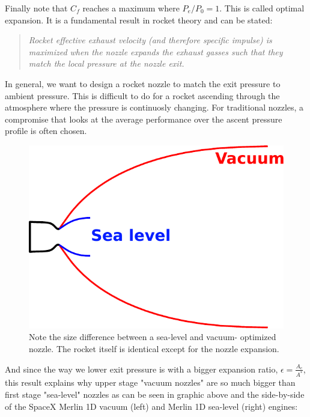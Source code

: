 \documentclass[twocolumn]{memoir} %
\begin{document}
Finally note that \(C_f\) reaches a maximum where \(P_e/P_0 = 1\). This
is called optimal expansion. It is a fundamental result in rocket theory
and can be stated:

\begin{quote}
    \emph{Rocket effective exhaust velocity (and therefore specific impulse) is
maximized when the nozzle expands the exhaust gasses such that they
    match the local pressure at the nozzle exit.}
\end{quote}

In general, we want to design a rocket nozzle to match
the exit pressure to ambient pressure. This is difficult to do for a
rocket ascending through the atmosphere where the pressure is
continuosly changing. For traditional nozzles, a compromise that looks
at the average performance over the ascent pressure profile is often
chosen.

\begin{figure}[H]
    \includegraphics[width=0.9\columnwidth]{nozzle_sl_vacuum.pdf}
    \caption{Note the size difference between a sea-level and vacuum- optimized 
    nozzle.  The rocket itself is identical except for the nozzle expansion.}
\end{figure}

And since the way we lower exit pressure is with a bigger expansion
ratio, \(\epsilon = \frac{A_e}{A^*}\), this result explains why upper
stage "vacuum nozzles" are so much bigger than first stage "sea-level"
nozzles as can be seen in graphic above and the side-by-side of the
SpaceX Merlin 1D vacuum (left) and Merlin 1D sea-level (right) engines:
\end{document}
